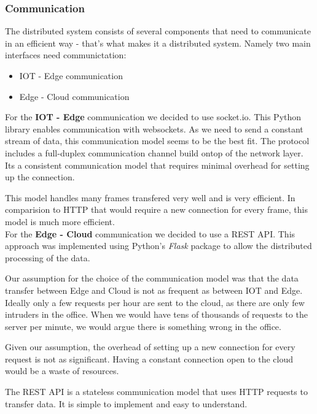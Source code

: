 \documentclass[conference]{IEEEtran}
\begin{document}
\subsubsection{Communication}
The distributed system consists of several components that need to communicate in an efficient way - that's what makes it a distributed system. 
Namely two main interfaces need communictation:
\\
\begin{itemize}
    \item IOT - Edge communication
    \item Edge - Cloud communication
\end{itemize}

\hfill \break
For the \textbf{IOT - Edge} communication we decided to use socket.io. This Python library enables communication with websockets. As we need to send a constant stream of data, this communication model seems to be the best fit. The protocol includes a full-duplex communication channel build ontop of the network layer. Its a consistent communication model that requires minimal overhead for setting up the connection. 

This model handles many frames transfered very well and is very efficient. In comparision to HTTP that would require a new connection for every frame, this model is much more efficient. 
\\


For the \textbf{Edge - Cloud} communication we decided to use a REST API. This approach was implemented using Python's \textit{Flask} package to allow the distributed processing of the data. 

Our assumption for the choice of the communication model was that the data transfer between Edge and Cloud is not as frequent as between IOT and Edge. Ideally only a few requests per hour are sent to the cloud, as there are only few intruders in the office. When we would have tens of thousands of requests to the server per minute, we would argue there is something wrong in the office. 

Given our assumption, the overhead of setting up a new connection for every request is not as significant. Having a constant connection open to the cloud would be a waste of resources. 

The REST API is a stateless communication model that uses HTTP requests to transfer data. It is simple to implement and easy to understand. 
\end{document}
